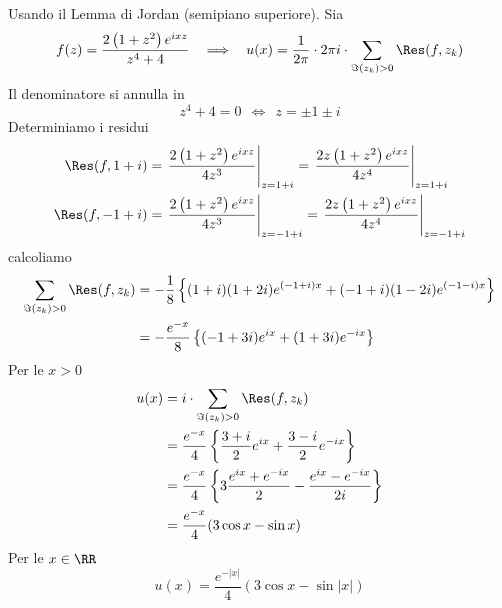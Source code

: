 Usando il Lemma di Jordan (semipiano superiore). Sia
\begin{equation*}
f(z) = \frac{2\left(1 + z^{2}\right) e^{ixz}}{z^{4} + 4} \ \ \implies \ \ u(x) = \frac{1}{2\pi} \cdot 2\pi i \cdot \sum_{\Im (z_{k}) > 0}\Res (f, z_{k})
\end{equation*}
Il denominatore si annulla in
\begin{equation*}
z^{4} + 4 = 0\ \ \iff \ \ z = \pm 1\pm i
\end{equation*}
Determiniamo i residui
\begin{align*}
\Res (f, 1 + i) & = \left. \frac{2\left(1 + z^{2}\right) e^{ixz}}{4z^{3}}\right|_{z = 1 + i} = \left. \frac{2z\left(1 + z^{2}\right) e^{ixz}}{4z^{4}}\right|_{z = 1 + i}\\
\Res (f, - 1 + i) & = \left. \frac{2\left(1 + z^{2}\right) e^{ixz}}{4z^{3}}\right|_{z = -1 + i} = \left. \frac{2z\left(1 + z^{2}\right) e^{ixz}}{4z^{4}}\right|_{z = -1 + i}
\end{align*}
calcoliamo
\begin{align*}
\sum_{\Im (z_{k}) > 0}\Res (f, z_{k}) & = - \frac{1}{8}\left\{(1 + i)(1 + 2i) e^{(- 1 + i) x} + (- 1 + i)(1 - 2i) e^{(- 1 - i) x}\right\}\\
 & = - \frac{e^{- x}}{8}\left\{(- 1 + 3i) e^{ix} + (1 + 3i) e^{- ix}\right\}
\end{align*}
Per le $x > 0$
\begin{align*}
u(x) & = i \cdot \sum_{\Im (z_{k}) > 0}\Res (f, z_{k})\\
 & = \frac{e^{- x}}{4}\left\{\frac{3 + i}{2} e^{ix} + \frac{3 - i}{2} e^{- ix}\right\}\\
 & = \frac{e^{- x}}{4}\left\{3\frac{e^{ix} + e^{- ix}}{2} - \frac{e^{ix} - e^{- ix}}{2i}\right\}\\
 & = \frac{e^{- x}}{4}(3\cos x - \sin x)
\end{align*}
Per le $x\in \RR $
\begin{equation*}
u(x) = \frac{e^{- | x|}}{4}(3\cos x - \sin| x|)
\end{equation*}

\Soluzione


